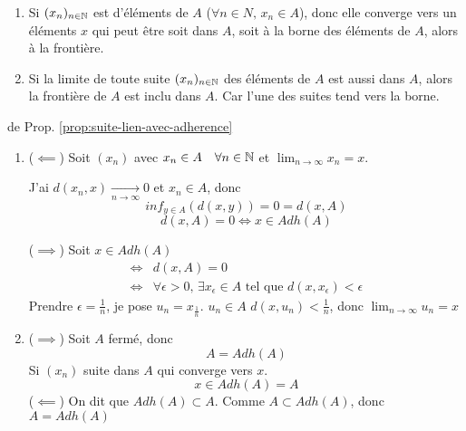 \begin{intuition}
   \begin{enumerate}
       \item Si $(x_n)_{n \in \mathbb{N}}$ est d'éléments de  $A$ ($\forall n \in N, \, x_n \in A$), donc elle converge vers un éléments $x$ qui peut être soit dans  $A$, soit à la borne des éléments de  $A$, alors à la frontière. 
       \item Si la limite de toute suite $(x_n)_{n \in \mathbb{N}}$ des éléments de  $A$ est aussi dans  $A$, alors la frontière de  $A$ est inclu dans  $A$. Car l'une des suites tend vers la borne.
   \end{enumerate} 
\end{intuition}
\begin{preuve} de Prop. \ref{prop:suite-lien-avec-adherence}
    \begin{enumerate}
        \item ($\impliedby$) Soit $(x_n)$ avec  $x_n \in A \quad \forall n \in \mathbb{N}$ et $\lim_{n \to \infty} x_n = x$.
            \par
            J'ai $d(x_n, x) \xrightarrow[n \to \infty]{} 0$ et $x_n \in A$, donc
             \[
                 inf_{y \in A}(d(x, y)) = 0 = d(x, A)
            \] 
            \[
            d(x, A) = 0 \iff x \in Adh(A)
            \] 
            \par
            ($\implies$) Soit $x \in Adh(A)$
             \begin{align*}
                 \iff& d(x, A) = 0\\
                \iff& \forall \epsilon > 0, \, \exists x_{\epsilon} \in A \text{ tel que } d(x, x_{\epsilon}) < \epsilon
            \end{align*}
            Prendre $\epsilon = \frac{1}{n}$, je pose $u_n = x_{\frac{1}{n}}$. $u_n \in A$  $d(x, u_n) < \frac{1}{n}$, donc $\lim_{n \to \infty} u_n = x$ 
        \item ($\implies$) Soit $A$ fermé, donc 
             \[
            A = Adh(A)
            \] 
            Si $(x_n)$ suite dans  $A$ qui converge vers  $x$.
             \[
            x \in Adh(A) = A
            \] 
            ($\impliedby$) On dit que $Adh(A) \subset A$. Comme $A \subset Adh(A)$, donc $A = Adh(A)$
    \end{enumerate} 
 \end{preuve}
